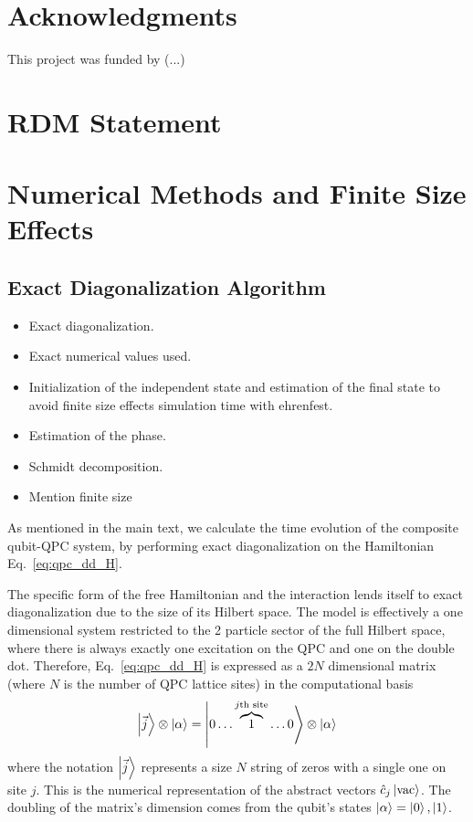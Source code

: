 \documentclass[10pt,
 amsmath,amssymb,
 aps,prb, twocolumn
]{revtex4-2}
\begin{document}
\section{Acknowledgments}

This project was funded by (...)

\section{RDM Statement}



\appendix 

\onecolumngrid 

\section{Numerical Methods and Finite Size Effects}\label{app:numerical_setup}

\subsection{Exact Diagonalization Algorithm}

\begin{itemize}
    \item Exact diagonalization.
    \item Exact numerical values used.
    \item Initialization of the independent state and estimation of the final state to avoid finite size effects simulation time with ehrenfest.
    \item Estimation of the phase.
    \item Schmidt decomposition.
    \item Mention finite size
\end{itemize}

As mentioned in the main text, we calculate the time evolution of the composite qubit-QPC system, by performing exact diagonalization on the Hamiltonian Eq.~\eqref{eq:qpc_dd_H}. 

The specific form of the free Hamiltonian and the interaction lends itself to exact diagonalization due to the size of its Hilbert space. The model is effectively a one dimensional system restricted to the 2 particle sector of the full Hilbert space, where there is always exactly one excitation on the QPC and one on the double dot. Therefore,  Eq.~\eqref{eq:qpc_dd_H} is expressed as a $2N$ dimensional matrix (where $N$ is the number of QPC lattice sites) in the computational basis
\begin{align}\label{eq:string_basis}
    \ket{\vec{j}}\otimes \ket{\alpha} = \ket{0\dots \overbrace{1}^{j\text{th site}} \dots0}\otimes\ket{\alpha}
\end{align}
where the notation \mbox{$\ket{\vec{j}}$} represents a size $N$ string of zeros with a single one on site $j$. This is the numerical representation of the abstract vectors \mbox{$\hat{c}_j\ket{\text{vac}}$}. The doubling of the matrix's dimension comes from the qubit's states \mbox{$\ket{\alpha} = \ket{0},\ket{1}$}.
\end{document}
